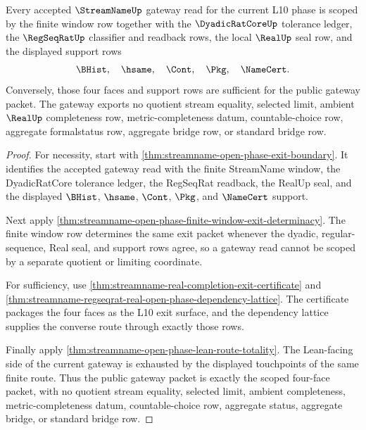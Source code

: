 \begin{theorem}
\label{thm:streamname-l10-gateway-scope}
Every accepted $\StreamNameUp$ gateway read for the current L10 phase is scoped by the finite window row together with the $\DyadicRatCoreUp$ tolerance ledger, the $\RegSeqRatUp$ classifier and readback rows, the local $\RealUp$ seal row, and the displayed support rows
$$
\BHist,\quad \hsame,\quad \Cont,\quad \Pkg,\quad \NameCert.
$$
Conversely, those four faces and support rows are sufficient for the public gateway packet. The gateway exports no quotient stream equality, selected limit, ambient $\RealUp$ completeness row, metric-completeness datum, countable-choice row, aggregate formalstatus row, aggregate bridge row, or standard bridge row.
\end{theorem}
\begin{proof}
For necessity, start with \autoref{thm:streamname-open-phase-exit-boundary}. It identifies the accepted gateway read with the finite StreamName window, the DyadicRatCore tolerance ledger, the RegSeqRat readback, the RealUp seal, and the displayed $\BHist$, $\hsame$, $\Cont$, $\Pkg$, and $\NameCert$ support.

Next apply \autoref{thm:streamname-open-phase-finite-window-exit-determinacy}. The finite window row determines the same exit packet whenever the dyadic, regular-sequence, Real seal, and support rows agree, so a gateway read cannot be scoped by a separate quotient or limiting coordinate.

For sufficiency, use \autoref{thm:streamname-real-completion-exit-certificate} and \autoref{thm:streamname-regseqrat-real-open-phase-dependency-lattice}. The certificate packages the four faces as the L10 exit surface, and the dependency lattice supplies the converse route through exactly those rows.

Finally apply \autoref{thm:streamname-open-phase-lean-route-totality}. The Lean-facing side of the current gateway is exhausted by the displayed touchpoints of the same finite route. Thus the public gateway packet is exactly the scoped four-face packet, with no quotient stream equality, selected limit, ambient completeness, metric-completeness datum, countable-choice row, aggregate status, aggregate bridge, or standard bridge row.
\end{proof}

